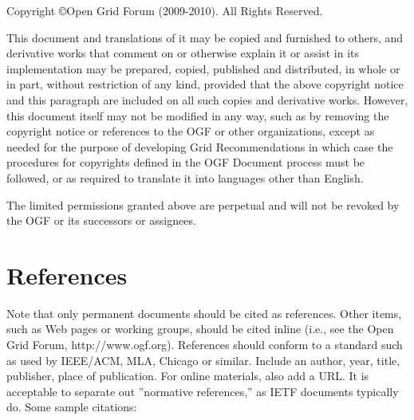 \documentclass[10pt,a4paper]{article}
\begin{document}
Copyright \copyright Open Grid Forum (2009-2010). All Rights Reserved.

This document and translations of it may be copied and furnished to others, and derivative works that comment on or otherwise explain it or assist in its implementation may be prepared, copied, published and distributed, in whole or in part, without restriction of any kind, provided that the above copyright notice and this paragraph are included on all such copies and derivative works. However, this document itself may not be modified in any way, such as by removing the copyright notice or references to the OGF or other organizations, except as needed for the purpose of developing Grid Recommendations in which case the procedures for copyrights defined in the OGF Document process must be followed, or as required to translate it into languages other than English.

The limited permissions granted above are perpetual and will not be revoked by the OGF or its successors or assignees.

\section{References}

Note that only permanent documents should be cited as references. Other items, such as Web pages or working groups, should be cited inline (i.e., see the Open Grid Forum, http://www.ogf.org). References should conform to a standard such as used by IEEE/ACM, MLA, Chicago or similar. Include an author, year, title, publisher, place of publication. For online materials, also add a URL. It is acceptable to separate out ''normative references,'' as IETF documents typically do. Some sample citations: 
\end{document}
